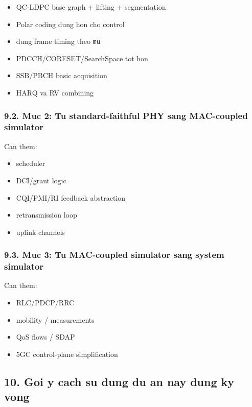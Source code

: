 \documentclass[
  vietnamese,
  a4paper,
  11pt]{article}
\providecommand{\tightlist}{%
  \setlength{\itemsep}{0pt}\setlength{\parskip}{0pt}}
\begin{document}
\begin{itemize}
\tightlist
\item
  QC-LDPC base graph + lifting + segmentation
\item
  Polar coding dung hon cho control
\item
  dung frame timing theo \texttt{mu}
\item
  PDCCH/CORESET/SearchSpace tot hon
\item
  SSB/PBCH basic acquisition
\item
  HARQ va RV combining
\end{itemize}

\subsubsection{9.2. Muc 2: Tu standard-faithful PHY sang MAC-coupled
simulator}\label{muc-2-tu-standard-faithful-phy-sang-mac-coupled-simulator}

Can them:

\begin{itemize}
\tightlist
\item
  scheduler
\item
  DCI/grant logic
\item
  CQI/PMI/RI feedback abstraction
\item
  retransmission loop
\item
  uplink channels
\end{itemize}

\subsubsection{9.3. Muc 3: Tu MAC-coupled simulator sang system
simulator}\label{muc-3-tu-mac-coupled-simulator-sang-system-simulator}

Can them:

\begin{itemize}
\tightlist
\item
  RLC/PDCP/RRC
\item
  mobility / measurements
\item
  QoS flows / SDAP
\item
  5GC control-plane simplification
\end{itemize}

\subsection{10. Goi y cach su dung du an nay dung ky
vong}\label{goi-y-cach-su-dung-du-an-nay-dung-ky-vong}
\end{document}
